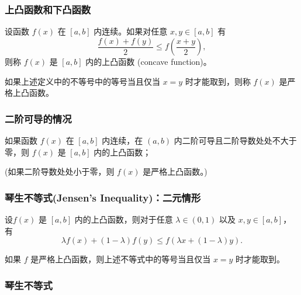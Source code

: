 \documentclass[CJK,13pt]{beamer}
\date{}
\begin{document}
  \bch

  

  \begin{frame}
    \frametitle{上凸函数和下凸函数}
    设函数 $f(x)$ 在 $[a,b]$ 内连续。如果对任意 $x,y\in[a,b]$ 有
    $$\frac{f(x)+f(y)}{2}\le f\left(\frac{x+y}{2}\right),$$
    则称 $f(x)$ 是 $[a,b]$ 内的上凸函数 (concave function)。

    如果上述定义中的不等号中的等号当且仅当 $x=y$ 时才能取到，则称 $f(x)$ 是严格上凸函数。
  \end{frame}


  \begin{frame}
    \frametitle{二阶可导的情况}
    如果函数 $f(x)$ 在 $[a,b]$ 内连续，在 $(a,b)$ 内二阶可导且二阶导数处处不大于零，则 $f(x)$ 是 $[a,b]$ 内的上凸函数；
    
    
    (如果二阶导数处处小于零，则 $f(x)$ 是严格上凸函数。)
  \end{frame}
  


  \begin{frame}
    \frametitle{琴生不等式(Jensen's Inequality)：二元情形}
    设$f(x)$ 是 $[a,b]$ 内的上凸函数，则对于任意 $\lambda\in(0,1)$ 以及 $x,y\in[a,b]$，有
    $$ \lambda f(x) + (1-\lambda)f(y) \le f\left(\lambda x + (1-\lambda) y\right).$$


    如果 $f$ 是严格上凸函数，则上述不等式中的等号当且仅当 $x=y$ 时才能取到。
    
  \end{frame}

  \begin{frame}
    \frametitle{琴生不等式}
  \end{frame}

\end{document}
